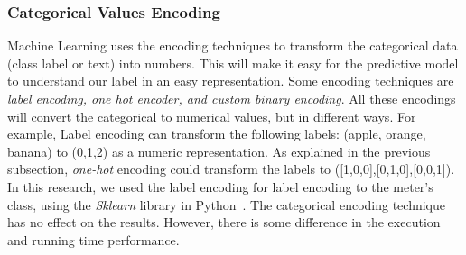 \subsubsection{Categorical Values Encoding}\label{sec:label_encoder}

Machine Learning uses the encoding techniques to transform the categorical data (class label or text) into numbers. 
This will make it easy for the predictive model to understand our label in an easy representation. 
Some encoding techniques are \textit{label encoding, one hot encoder, and custom \textit{binary} encoding}. 
All these encodings will convert the categorical to numerical values, but in different ways. 
For example, Label encoding can transform the following labels: (apple, orange, banana) to (0,1,2) as a numeric representation. 
As explained in the previous subsection, \textit{one-hot} encoding could transform the labels to ([1,0,0],[0,1,0],[0,0,1]). 
In this research, we used the label encoding for label encoding to the meter’s class, using the \textit{Sklearn} library in Python~\cite{scikit-learn}. The categorical encoding technique has no effect on the results. However, there is some difference in the execution and running time performance.

\clearpage



